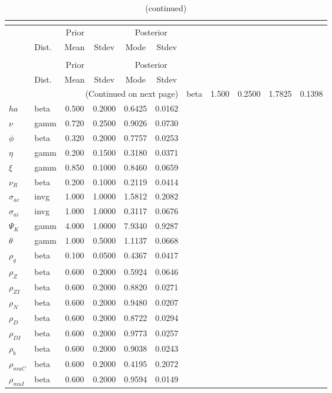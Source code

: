  
\begin{center}
\begin{longtable}{llcccc} 
\caption{Results from posterior maximization (parameters)}\\
 \label{Table:Posterior:1}\\
\toprule 
  & \multicolumn{3}{c}{Prior}  &  \multicolumn{2}{c}{Posterior} \\
  \cmidrule(r{.75em}){2-4} \cmidrule(r{.75em}){5-6}
  & Dist. & Mean  & Stdev & Mode & Stdev \\ 
\midrule \endfirsthead 
\caption{(continued)}\\
 \bottomrule 
  & \multicolumn{3}{c}{Prior}  &  \multicolumn{2}{c}{Posterior} \\
  \cmidrule(r{.75em}){2-4} \cmidrule(r{.75em}){5-6}
  & Dist. & Mean  & Stdev & Mode & Stdev \\ 
\midrule \endhead 
\bottomrule \multicolumn{6}{r}{(Continued on next page)}\endfoot 
\bottomrule\endlastfoot 
${\sigma}$ & beta &   1.500 & 0.2500 &   1.7825 &  0.1398 \\ 
${ha}$ & beta &   0.500 & 0.2000 &   0.6425 &  0.0162 \\ 
$\nu$ & gamm &   0.720 & 0.2500 &   0.9026 &  0.0730 \\ 
${\phi}$ & beta &   0.320 & 0.2000 &   0.7757 &  0.0253 \\ 
${\eta}$ & gamm &   0.200 & 0.1500 &   0.3180 &  0.0371 \\ 
$\xi$ & gamm &   0.850 & 0.1000 &   0.8460 &  0.0659 \\ 
${\nu_R}$ & beta &   0.200 & 0.1000 &   0.2119 &  0.0414 \\ 
${\sigma_{ac}}$ & invg &   1.000 & 1.0000 &   1.5812 &  0.2082 \\ 
${\sigma_{ai}}$ & invg &   1.000 & 1.0000 &   0.3117 &  0.0676 \\ 
${\Psi_{K}}$ & gamm &   4.000 & 1.0000 &   7.9340 &  0.9287 \\ 
${\theta}$ & gamm &   1.000 & 0.5000 &   1.1137 &  0.0668 \\ 
${\rho_g}$ & beta &   0.100 & 0.0500 &   0.4367 &  0.0417 \\ 
${\rho_Z}$ & beta &   0.600 & 0.2000 &   0.5924 &  0.0646 \\ 
${\rho_{ZI}}$ & beta &   0.600 & 0.2000 &   0.8820 &  0.0271 \\ 
${\rho_N}$ & beta &   0.600 & 0.2000 &   0.9480 &  0.0207 \\ 
${\rho_D}$ & beta &   0.600 & 0.2000 &   0.8722 &  0.0294 \\ 
${\rho_{DI}}$ & beta &   0.600 & 0.2000 &   0.9773 &  0.0257 \\ 
${\rho_b}$ & beta &   0.600 & 0.2000 &   0.9038 &  0.0243 \\ 
${\rho_{muC}}$ & beta &   0.600 & 0.2000 &   0.4195 &  0.2072 \\ 
${\rho_{muI}}$ & beta &   0.600 & 0.2000 &   0.9594 &  0.0149 \\ 
\end{longtable}
 \end{center}
